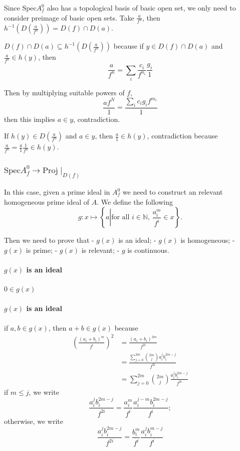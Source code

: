 \documentclass[11pt]{article}
\begin{document}
    Since \(\mathrm{Spec}A^0_f\) also has a topological basis of basic open
set, we only need to consider preimage of basic open sets. Take
\(\frac{a}{f^n}\), then
\(h^{-1}\left(D\left(\frac a{f^n}\right)\right)=D(f)\cap D(a)\).

    \(D(f)\cap D(a)\subseteq h^{-1}\left(D\left(\frac a{f^n}\right)\right)\)
because if \(y\in D(f)\cap D(a)\) and \(\frac a{f^n}\in h(y)\), then \[
\frac a{f^n}=\sum_i \frac{c_i}{f^{n_i}}\frac{g_i}1
\]

Then by multiplying suitable powers of \(f\), \[
\frac{a f^N}1=\frac{\sum_i c_ig_if^{m_i}}1
\] then this implies \(a\in y\), contradiction.

    If \(h(y)\in D\left(\frac a{f^n}\right)\) and \(a\in y\), then
\(\frac a 1\in h(y)\), contradiction because
\(\frac a{f^n}=\frac a1\frac1{f^n}\in h(y)\).

    \hypertarget{mathrmspec-a0_ftomathrmprojmid_df}{%
\subsubsection{\texorpdfstring{\(\mathrm{Spec} A^0_f\to\mathrm{Proj}\mid_{D(f)}\)}{\textbackslash mathrm\{Spec\} A\^{}0\_f\textbackslash to\textbackslash mathrm\{Proj\}\textbackslash mid\_\{D(f)\}}}\label{mathrmspec-a0_ftomathrmprojmid_df}}

In this case, given a prime ideal in \(A^0_f\) we need to construct an
relevant homogeneous prime ideal of \(A\). We define the following \[
g:x \mapsto \left\{a\left|\text{for all $i\in\mathbb N$, $\frac{a_i^m}{f^i}\in x$}\right.\right\}.
\]

Then we need to prove that - \(g(x)\) is an ideal; - \(g(x)\) is
homogeneous; - \(g(x)\) is prime; - \(g(x)\) is relevant; - \(g\) is
continuous.

    \hypertarget{gx-is-an-ideal}{%
\paragraph{\texorpdfstring{\(g(x)\) is an
ideal}{g(x) is an ideal}}\label{gx-is-an-ideal}}

\(0\in g(x)\)

    \hypertarget{gx-is-an-ideal}{%
\paragraph{\texorpdfstring{\(g(x)\) is an
ideal}{g(x) is an ideal}}\label{gx-is-an-ideal}}

if \(a,b\in g(x)\), then \(a + b\in g(x)\) because
\begin{equation*}
\begin{aligned}
\left(\frac{(a_i+b_i)^m}{f^i}\right)^2 &=\frac{(a_i+b_i)^{2m}}{f^{2i}} \\
&= \frac{\sum_{j=0}^{2m}{2m\choose j}a_i^j b_i^{2m-j}}{f^{2i}} \\
&= \sum_{j=0}^{2m}{2m\choose j}\frac{a_i^j b_i^{2m-j}}{f^{2i}}
\end{aligned}
\end{equation*}
if \(m\le j\), we write \[
\frac{a_i^j b_i^{2m-j}}{f^{2i}} = \frac{a_i^m}{f^i}\frac{a_i^{j-m}b_i^{2m-j}}{f^i};
\] otherwise, we write \[
\frac{a_i^j b_i^{2m-j}}{f^{2i}} =\frac{b_i^m}{f^i}\frac{a_i^jb_i^{m-j}}{f^i}
\]
\end{document}
